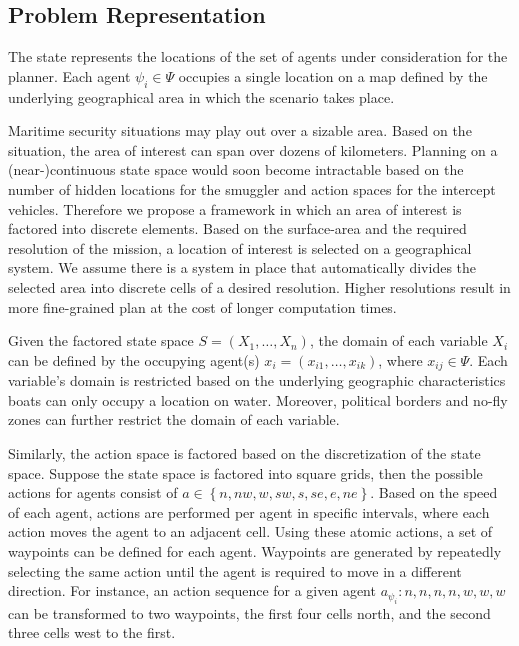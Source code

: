 \documentclass[conference]{IEEEtran}
\begin{document}
\subsection{Problem Representation}
\label{sub:problem-rep}

The state represents the locations of the set of agents under consideration for the planner. Each agent $\psi_i\in\Psi$ occupies a single location on a map defined by the underlying geographical area in which the scenario takes place.

Maritime security situations may play out over a sizable area. Based on the situation, the area of interest can span over dozens of kilometers. Planning on a (near-)continuous state space would soon become intractable based on the number of hidden locations for the smuggler and action spaces for the intercept vehicles. Therefore we propose a framework in which an area of interest is factored into discrete elements. Based on the surface-area and the required resolution of the mission, a location of interest is selected on a geographical system. We assume there is a system in place that automatically divides the selected area into discrete cells of a desired resolution. Higher resolutions result in more fine-grained plan at the cost of longer computation times.

Given the factored state space $S = \left(X_1,\ldots,X_n\right)$, the domain of each variable $X_i$ can be defined by the occupying agent(s) \ie $x_i=\left(x_{i1},\ldots,x_{ik}\right)$, where $x_{ij}\in\Psi$. Each variable's domain is restricted based on the underlying geographic characteristics \ie boats can only occupy a location on water. Moreover, political borders and no-fly zones can further restrict the domain of each variable.

Similarly, the action space is factored based on the discretization of the state space. Suppose the state space is factored into square grids, then the possible actions for agents consist of $a\in\left\{n, nw, w, sw, s, se, e, ne\right\}$. Based on the speed of each agent, actions are performed per agent in specific intervals, where each action moves the agent to an adjacent cell. Using these atomic actions, a set of waypoints can be defined for each agent. Waypoints are generated by repeatedly selecting the same action until the agent is required to move in a different direction. For instance, an action sequence for a given agent $a_{\psi_i}: n, n, n, n, w, w, w$ can be transformed to two waypoints, the first four cells north, and the second three cells west to the first.
\end{document}

